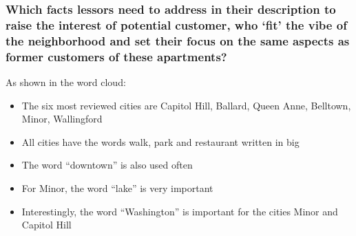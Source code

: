 \documentclass{beamer}
\begin{document}

\begin{frame}
\frametitle{Which facts lessors need to address in their description to raise the interest of potential customer, who ‘fit’ the vibe of the neighborhood and set their focus on the same aspects as former customers of these apartments?}
As shown in the word cloud:
\begin{itemize}
\item The six most reviewed cities are Capitol Hill, Ballard, Queen Anne, Belltown, Minor, Wallingford 
\item All cities have the words walk, park and restaurant written in big
\item The word “downtown” is also used often
\item For Minor, the word “lake” is very important
\item Interestingly, the word “Washington” is important for the cities Minor and Capitol Hill
\end{itemize}
\end{frame}

\end{document}
